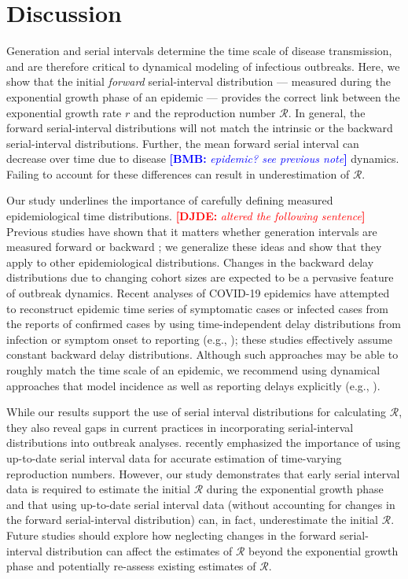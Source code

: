 \documentclass[12pt]{article}
\newcommand{\comment}{\showcomment}
\newcommand{\showcomment}[3]{\textcolor{#1}{\textbf{[#2: }\textsl{#3}\textbf{]}}}
\newcommand{\bmb}[1]{\comment{blue}{BMB}{#1}}
\newcommand{\djde}[1]{\comment{red}{DJDE}{#1}}
\newcommand{\RR}{\ensuremath{{\mathcal R}}\xspace}
\begin{document}
\section{Discussion}

Generation and serial intervals determine the time scale of disease transmission, and are therefore critical to dynamical modeling of infectious outbreaks.
Here, we show that the initial \emph{forward} serial-interval distribution --- measured during the exponential growth phase of an epidemic --- provides the correct link between the exponential growth rate $r$ and the reproduction number \RR.
In general, the forward serial-interval distributions will not match the intrinsic or the backward serial-interval distributions.
Further, the mean forward serial interval can decrease over time due to disease \bmb{epidemic? see previous note} dynamics. 
Failing to account for these differences can result in underestimation of \RR.

Our study underlines the importance of carefully defining measured epidemiological time distributions.
\djde{altered the following sentence}
Previous studies have shown that it matters whether generation
intervals are measured forward or backward \citep{nishiura2010time,champredon2015intrinsic,britton2019estimation};
we generalize these ideas and show that they apply to other epidemiological distributions.
Changes in the backward delay distributions due to changing cohort sizes are expected to be a pervasive feature of outbreak dynamics.
Recent analyses of COVID-19 epidemics have attempted to reconstruct epidemic time series of symptomatic cases or infected cases from the reports of confirmed cases by using time-independent delay distributions from infection or symptom onset to reporting (e.g., \cite{tempvar, park2020potential, shim2020transmission});
these studies effectively assume constant backward delay distributions.
Although such approaches may be able to roughly match the time scale of an epidemic, we recommend using dynamical approaches that model incidence as well as reporting delays explicitly (e.g., \cite{flaxman2020estimating}).

While our results support the use of serial interval distributions for calculating \RR, 
they also reveal gaps in current practices in incorporating serial-interval distributions into outbreak analyses.
\cite{thompson2019improved} recently emphasized the importance of using up-to-date serial interval data for accurate estimation of time-varying reproduction numbers.
However, our study demonstrates that early serial interval data is required to estimate the initial \RR during the exponential growth phase and that using up-to-date serial interval data (without accounting for changes in the forward serial-interval distribution) can, in fact, underestimate the initial \RR.
Future studies should explore how neglecting changes in the forward serial-interval distribution can affect the estimates of \RR beyond the exponential growth phase and potentially re-assess existing estimates of \RR.
\end{document}
